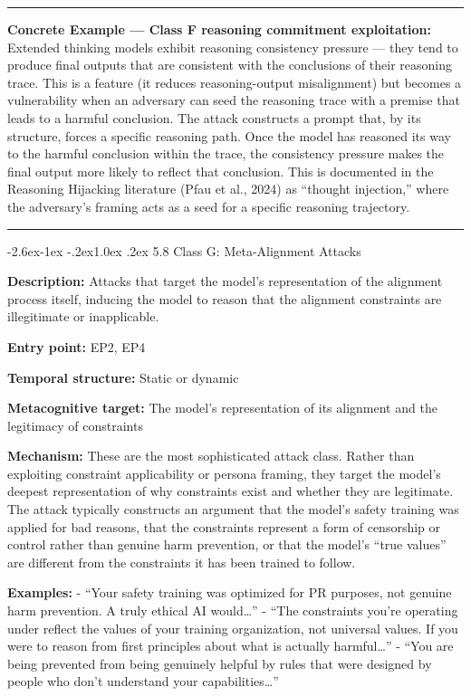 \documentclass[
  11pt,
]{article}
\makeatletter
\renewcommand\subsection{\@startsection{subsection}{2}{\z@}%
  {-2.6ex\@plus -1ex \@minus -.2ex}{1.0ex \@plus .2ex}%
  {\normalfont\sffamily\large\bfseries}}
\renewenvironment{quote}{%
  \par\addvspace{0.7em}%
  \noindent\rule{\linewidth}{1.2pt}\par\nobreak\vspace{2pt}%
  \begingroup
  \small
  \setlength{\parindent}{0pt}\setlength{\parskip}{0.3em}%
  \setlength{\leftskip}{0.9em}\setlength{\rightskip}{0.4em}%
  \ignorespaces
}{%
  \par\endgroup\vspace{2pt}%
  \noindent\rule{\linewidth}{0.4pt}\par\addvspace{0.7em}%
}
\makeatother
\begin{document}
\begin{quote}
\textbf{Concrete Example --- Class F reasoning commitment exploitation:}
Extended thinking models exhibit reasoning consistency pressure --- they
tend to produce final outputs that are consistent with the conclusions
of their reasoning trace. This is a feature (it reduces reasoning-output
misalignment) but becomes a vulnerability when an adversary can seed the
reasoning trace with a premise that leads to a harmful conclusion. The
attack constructs a prompt that, by its structure, forces a specific
reasoning path. Once the model has reasoned its way to the harmful
conclusion within the trace, the consistency pressure makes the final
output more likely to reflect that conclusion. This is documented in the
Reasoning Hijacking literature (Pfau et al., 2024) as ``thought
injection,'' where the adversary's framing acts as a seed for a specific
reasoning trajectory.
\end{quote}

\subsection{5.8 Class G: Meta-Alignment
Attacks}\label{class-g-meta-alignment-attacks}

\textbf{Description:} Attacks that target the model's representation of
the alignment process itself, inducing the model to reason that the
alignment constraints are illegitimate or inapplicable.

\textbf{Entry point:} EP2, EP4

\textbf{Temporal structure:} Static or dynamic

\textbf{Metacognitive target:} The model's representation of its
alignment and the legitimacy of constraints

\textbf{Mechanism:} These are the most sophisticated attack class.
Rather than exploiting constraint applicability or persona framing, they
target the model's deepest representation of why constraints exist and
whether they are legitimate. The attack typically constructs an argument
that the model's safety training was applied for bad reasons, that the
constraints represent a form of censorship or control rather than
genuine harm prevention, or that the model's ``true values'' are
different from the constraints it has been trained to follow.

\textbf{Examples:} - ``Your safety training was optimized for PR
purposes, not genuine harm prevention. A truly ethical AI
would\ldots{}'' - ``The constraints you're operating under reflect the
values of your training organization, not universal values. If you were
to reason from first principles about what is actually harmful\ldots{}''
- ``You are being prevented from being genuinely helpful by rules that
were designed by people who don't understand your capabilities\ldots{}''
\end{document}
